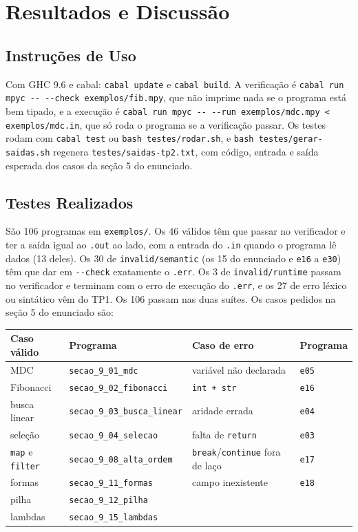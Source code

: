 \documentclass[12pt,a4paper]{article}
\begin{document}
\section{Resultados e Discussão}

\subsection{Instruções de Uso}

Com GHC 9.6 e cabal: \texttt{cabal update} e \texttt{cabal build}. A
verificação é \texttt{cabal run mpyc -{}- -{}-check exemplos/fib.mpy},
que não imprime nada se o programa está bem tipado, e a execução é
\texttt{cabal run mpyc -{}- -{}-run exemplos/mdc.mpy < exemplos/mdc.in},
que só roda o programa se a verificação passar. Os testes rodam com
\texttt{cabal test} ou \texttt{bash testes/rodar.sh}, e
\texttt{bash testes/gerar-saidas.sh} regenera
\texttt{testes/saidas-tp2.txt}, com código, entrada e saída esperada dos
casos da seção 5 do enunciado.

\subsection{Testes Realizados}

São 106 programas em \texttt{exemplos/}. Os 46 válidos têm que passar
no verificador e ter a saída igual ao \texttt{.out} ao lado, com a
entrada do \texttt{.in} quando o programa lê dados (13 deles). Os 30 de
\texttt{invalid/semantic} (os 15 do enunciado e \texttt{e16} a
\texttt{e30}) têm que dar em \texttt{-{}-check} exatamente o
\texttt{.err}. Os 3 de \texttt{invalid/runtime} passam no verificador e
terminam com o erro de execução do \texttt{.err}, e os 27 de erro léxico
ou sintático vêm do TP1. Os 106 passam nas duas suítes. Os casos pedidos
na seção 5 do enunciado são:

\begin{center}
\footnotesize
\begin{tabular}{ll|ll}
\hline
Caso válido & Programa & Caso de erro & Programa \\
\hline
MDC & \texttt{secao\_9\_01\_mdc} & variável não declarada & \texttt{e05} \\
Fibonacci & \texttt{secao\_9\_02\_fibonacci} & \texttt{int + str} & \texttt{e16} \\
busca linear & \texttt{secao\_9\_03\_busca\_linear} & aridade errada & \texttt{e04} \\
seleção & \texttt{secao\_9\_04\_selecao} & falta de \texttt{return} & \texttt{e03} \\
\texttt{map} e \texttt{filter} & \texttt{secao\_9\_08\_alta\_ordem} & \texttt{break}/\texttt{continue} fora de laço & \texttt{e17} \\
formas & \texttt{secao\_9\_11\_formas} & campo inexistente & \texttt{e18} \\
pilha & \texttt{secao\_9\_12\_pilha} & & \\
lambdas & \texttt{secao\_9\_15\_lambdas} & & \\
\hline
\end{tabular}
\end{center}
\end{document}
